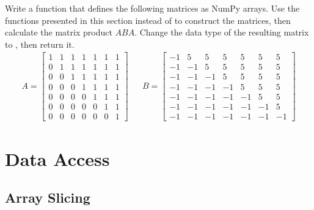 \begin{problem} %
Write a function that defines the following matrices as NumPy arrays.
Use the functions presented in this section instead of  to construct the matrices, then calculate the matrix product $ABA$.
Change the data type of the resulting matrix to , then return it.
\begin{align*}
A = \left[\begin{array}{rrrrrrr}
1 & 1 & 1 & 1 & 1 & 1 & 1\\
0 & 1 & 1 & 1 & 1 & 1 & 1\\
0 & 0 & 1 & 1 & 1 & 1 & 1\\
0 & 0 & 0 & 1 & 1 & 1 & 1\\
0 & 0 & 0 & 0 & 1 & 1 & 1\\
0 & 0 & 0 & 0 & 0 & 1 & 1\\
0 & 0 & 0 & 0 & 0 & 0 & 1\end{array}\right]
&&
B = \left[\begin{array}{rrrrrrr}
-1 &  5 &  5 &  5 &  5 &  5 &  5\\
-1 & -1 &  5 &  5 &  5 &  5 &  5\\
-1 & -1 & -1 &  5 &  5 &  5 &  5\\
-1 & -1 & -1 & -1 &  5 &  5 &  5\\
-1 & -1 & -1 & -1 & -1 &  5 &  5\\
-1 & -1 & -1 & -1 & -1 & -1 &  5\\
-1 & -1 & -1 & -1 & -1 & -1 & -1\end{array}\right]
\end{align*}
\label{prob:simple3}
\end{problem}

\section*{Data Access} %

\subsection*{Array Slicing} %

